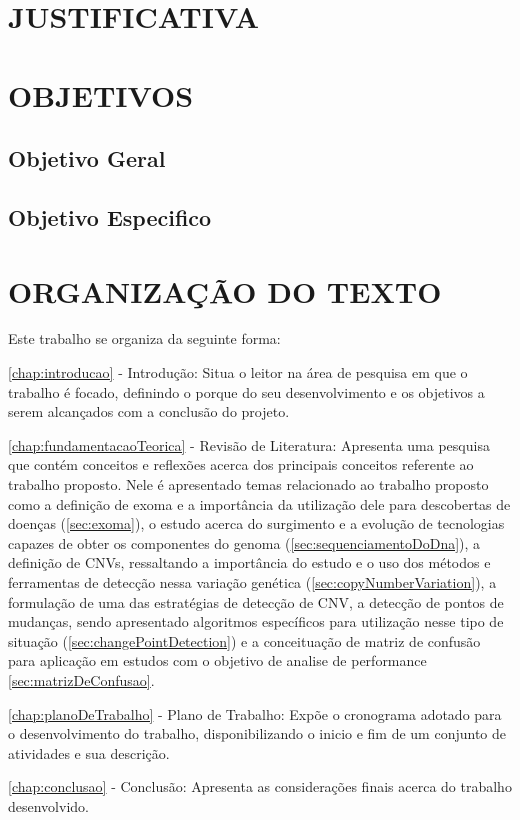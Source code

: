 \section{JUSTIFICATIVA}



\section{OBJETIVOS}

\subsection{Objetivo Geral}

\subsection{Objetivo Especifico}

\section{ORGANIZAÇÃO DO TEXTO}

Este trabalho se organiza da seguinte forma:

\autoref{chap:introducao} - Introdução: Situa o leitor na área de pesquisa em que o trabalho é focado, definindo o porque do seu desenvolvimento e os objetivos a serem alcançados com a conclusão do projeto.

\autoref{chap:fundamentacaoTeorica} - Revisão de Literatura: Apresenta uma pesquisa que contém conceitos e reflexões acerca dos principais conceitos referente ao trabalho proposto. Nele é apresentado temas relacionado ao trabalho proposto como a definição de exoma e a importância da utilização dele para descobertas de doenças (\autoref{sec:exoma}), o estudo acerca do surgimento e a evolução de tecnologias capazes de obter os componentes do genoma (\autoref{sec:sequenciamentoDoDna}), a definição de CNVs, ressaltando a importância do estudo e o uso dos métodos e ferramentas de detecção nessa variação genética (\autoref{sec:copyNumberVariation}), a formulação de uma das estratégias de detecção de CNV, a detecção de pontos de mudanças, sendo apresentado algoritmos específicos para utilização nesse tipo de situação (\autoref{sec:changePointDetection}) e a conceituação de matriz de confusão para aplicação em estudos com o objetivo de analise de performance \autoref{sec:matrizDeConfusao}.

\autoref{chap:planoDeTrabalho} - Plano de Trabalho: Expõe o cronograma adotado para o desenvolvimento do trabalho, disponibilizando o inicio e fim de um conjunto de atividades e sua descrição.

\autoref{chap:conclusao} - Conclusão: Apresenta as considerações finais acerca do trabalho desenvolvido.
